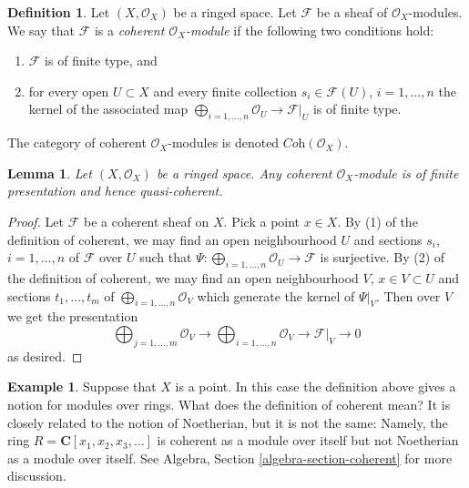 \documentclass{stacks-project}
\theoremstyle{plain}
\newtheorem{lemma}[subsection]{Lemma}
\theoremstyle{definition}
\newtheorem{definition}[subsection]{Definition}
\newtheorem{example}[subsection]{Example}
\theoremstyle{remark}
\numberwithin{equation}{subsection}
\begin{document}
\begin{definition}
\label{definition-coherent}
Let $(X, \mathcal{O}_X)$ be a ringed space.
Let $\mathcal{F}$ be a sheaf of $\mathcal{O}_X$-modules.
We say that $\mathcal{F}$ is a {\it coherent $\mathcal{O}_X$-module}
if the following two conditions hold:
\begin{enumerate}
\item $\mathcal{F}$ is of finite type, and
\item for every open $U \subset X$ and every finite
collection $s_i \in \mathcal{F}(U)$, $i = 1, \ldots, n$
the kernel of the associated map
$\bigoplus_{i = 1, \ldots, n} \mathcal{O}_U \to \mathcal{F}|_U$
is of finite type.
\end{enumerate}
The category of coherent $\mathcal{O}_X$-modules is denoted
$\textit{Coh}(\mathcal{O}_X)$.
\end{definition}

\begin{lemma}
\label{lemma-coherent-finite-presentation}
Let $(X, \mathcal{O}_X)$ be a ringed space.
Any coherent $\mathcal{O}_X$-module is of finite presentation
and hence quasi-coherent.
\end{lemma}

\begin{proof}
Let $\mathcal{F}$ be a coherent sheaf on $X$.
Pick a point $x \in X$.
By (1) of the definition of coherent, we may find an open neighbourhood $U$
and sections $s_i$, $i = 1, \ldots, n$ of $\mathcal{F}$ over $U$
such that $\Psi : \bigoplus_{i = 1, \ldots, n} \mathcal{O}_U \to \mathcal{F}$
is surjective. By (2) of the definition of coherent, we may find
an open neighbourhood $V$, $x \in V \subset U$ and sections
$t_1, \ldots, t_m$ of $\bigoplus_{i = 1, \ldots, n} \mathcal{O}_V$
which generate the kernel of $\Psi|_V$. Then over $V$ we get the
presentation
$$
\bigoplus\nolimits_{j = 1, \ldots, m}
\mathcal{O}_V
\longrightarrow
\bigoplus\nolimits_{i = 1, \ldots, n}
\mathcal{O}_V
\to
\mathcal{F}|_V
\to
0
$$
as desired.
\end{proof}

\begin{example}
\label{example-coherent-not-Noetherian}
Suppose that $X$ is a point. In this case the definition
above gives a notion for modules over rings.
What does the definition of coherent mean?
It is closely related to the notion of Noetherian,
but it is not the same: Namely, the ring
$R = \mathbf{C}[x_1, x_2, x_3, \ldots]$ is coherent
as a module over itself but not Noetherian as a module
over itself. See Algebra, Section \ref{algebra-section-coherent}
for more discussion.
\end{example}
\end{document}
